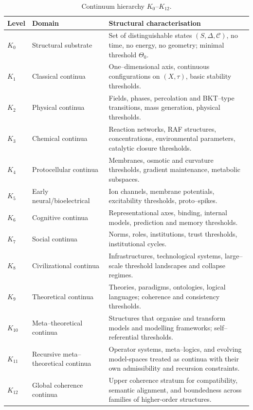 \begin{table}[htbp]
  \centering
  \caption{Continuum hierarchy \texorpdfstring{\(K_0\)}{K_0}–\(K_{12}\).}
  \label{tab:klevels-overview}
  \begin{tabular}{@{}L{0.08\textwidth}L{0.18\textwidth}L{0.58\textwidth}@{}}
    \hline
    Level & Domain & Structural characterisation \\
    \hline
    \(K_0\) & Structural substrate &
      Set of distinguishable states \((S,\Delta,\mathcal{C})\), no time,
      no energy, no geometry; minimal threshold \(\Theta_0\). \\[0.3em]
    \(K_1\) & Classical continua &
      One--dimensional axis, continuous configurations on \((X,\tau)\),
      basic stability thresholds. \\[0.3em]
    \(K_2\) & Physical continua &
      Fields, phases, percolation and BKT--type transitions, mass
      generation, physical thresholds. \\[0.3em]
    \(K_3\) & Chemical continua &
      Reaction networks, RAF structures, concentrations, environmental
      parameters, catalytic closure thresholds. \\[0.3em]
    \(K_4\) & Protocellular continua &
      Membranes, osmotic and curvature thresholds, gradient maintenance,
      metabolic subspaces. \\[0.3em]
    \(K_5\) & Early neural/bioelectrical &
      Ion channels, membrane potentials, excitability thresholds, proto--spikes. \\[0.3em]
    \(K_6\) & Cognitive continua &
      Representational axes, binding, internal models, prediction and
      memory thresholds. \\[0.3em]
    \(K_7\) & Social continua &
      Norms, roles, institutions, trust thresholds, institutional cycles. \\[0.3em]
    \(K_8\) & Civilizational continua &
      Infrastructures, technological systems, large--scale threshold
      landscapes and collapse regimes. \\[0.3em]
    \(K_9\) & Theoretical continua &
      Theories, paradigms, ontologies, logical languages; coherence and
      consistency thresholds. \\[0.3em]
    \(K_{10}\) & Meta--theoretical continua &
      Structures that organise and transform models and modelling
      frameworks; self--referential thresholds. \\[0.3em]
    \(K_{11}\) & Recursive meta--theoretical continua &
      Operator systems, meta--logics, and evolving model-spaces treated as
      continua with their own admissibility and recursion constraints. \\[0.3em]
    \(K_{12}\) & Global coherence continua &
      Upper coherence stratum for compatibility, semantic alignment, and
      boundedness across families of higher-order structures. \\
    \hline
  \end{tabular}
\end{table}

